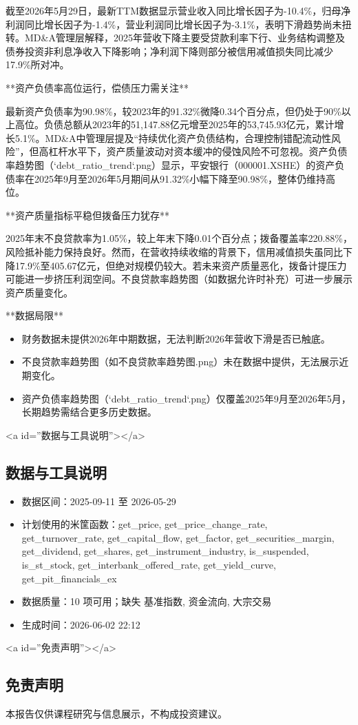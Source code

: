 \documentclass[12pt,a4paper]{article}
\begin{document}
截至2026年5月29日，最新TTM数据显示营业收入同比增长因子为-10.4\%，归母净利润同比增长因子为-1.4\%，营业利润同比增长因子为-3.1\%，表明下滑趋势尚未扭转。MD\&A管理层解释，2025年营收下降主要受贷款利率下行、业务结构调整及债券投资非利息净收入下降影响；净利润下降则部分被信用减值损失同比减少17.9\%所对冲。

**资产负债率高位运行，偿债压力需关注**

最新资产负债率为90.98\%，较2023年的91.32\%微降0.34个百分点，但仍处于90\%以上高位。负债总额从2023年的51,147.88亿元增至2025年的53,745.93亿元，累计增长5.1\%。MD\&A中管理层提及“持续优化资产负债结构，合理控制错配流动性风险”，但高杠杆水平下，资产质量波动对资本缓冲的侵蚀风险不可忽视。资产负债率趋势图（`debt\_ratio\_trend`.png）显示，平安银行（000001.XSHE）的资产负债率在2025年9月至2026年5月期间从91.32\%小幅下降至90.98\%，整体仍维持高位。

**资产质量指标平稳但拨备压力犹存**

2025年末不良贷款率为1.05\%，较上年末下降0.01个百分点；拨备覆盖率220.88\%，风险抵补能力保持良好。然而，在营收持续收缩的背景下，信用减值损失虽同比下降17.9\%至405.67亿元，但绝对规模仍较大。若未来资产质量恶化，拨备计提压力可能进一步挤压利润空间。不良贷款率趋势图（如数据允许时补充）可进一步展示资产质量变化。

**数据局限**

\begin{itemize}
\item 财务数据未提供2026年中期数据，无法判断2026年营收下滑是否已触底。
\item 不良贷款率趋势图（如不良贷款率趋势图.png）未在数据中提供，无法展示近期变化。
\item 资产负债率趋势图（`debt\_ratio\_trend`.png）仅覆盖2025年9月至2026年5月，长期趋势需结合更多历史数据。
\end{itemize}

<a id=''数据与工具说明''></a>

\subsection{ 数据与工具说明}
\begin{itemize}
\item 数据区间：2025-09-11 至 2026-05-29
\item 计划使用的米筐函数：get\_price, get\_price\_change\_rate, get\_turnover\_rate, get\_capital\_flow, get\_factor, get\_securities\_margin, get\_dividend, get\_shares, get\_instrument\_industry, is\_suspended, is\_st\_stock, get\_interbank\_offered\_rate, get\_yield\_curve, get\_pit\_financials\_ex
\item 数据质量：10 项可用；缺失 基准指数, 资金流向, 大宗交易
\item 生成时间：2026-06-02 22:12
\end{itemize}

<a id=''免责声明''></a>

\subsection{ 免责声明}
本报告仅供课程研究与信息展示，不构成投资建议。
\end{document}
